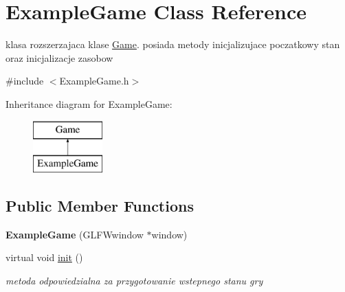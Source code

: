 \hypertarget{class_example_game}{}\section{Example\+Game Class Reference}
\label{class_example_game}


klasa rozszerzajaca klase \hyperlink{class_game}{Game}. posiada metody inicjalizujace poczatkowy stan oraz inicjalizacje zasobow  




{\ttfamily \#include $<$Example\+Game.\+h$>$}

Inheritance diagram for Example\+Game\+:\begin{figure}[H]
\begin{center}
\leavevmode
\includegraphics[height=2.000000cm]{class_example_game}
\end{center}
\end{figure}
\subsection*{Public Member Functions}
\begin{DoxyCompactItemize}
\item 
\mbox{\label{class_example_game_adb33bb2a79998a43a0341e2aacf0e6c7}} 
{\bfseries Example\+Game} (G\+L\+F\+Wwindow $\ast$window)
\item 
virtual void \hyperlink{class_example_game_ab7b84dad80cbf4eefd562f0c8e6495ab}{init} ()
\begin{DoxyCompactList}\small\item\em metoda odpowiedzialna za przygotowanie wstepnego stanu gry \end{DoxyCompactList}\end{DoxyCompactItemize}
